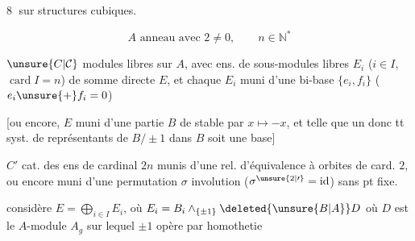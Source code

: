 \textcircled{8}  sur structures cubiques.

\[
 A\text{ anneau avec }2\ne0,\qquad n\in\mathbb{N}^{*}
\]

$\unsure{C|\mathcal{C}}$  modules libres  sur $A$, avec  ens. de  sous-modules libres $E_i$ ($i\in I$, $\operatorname{card} I=n$) de somme directe $E$, et chaque $E_i$ muni d'une bi-base $\{e_i,f_i\}$ ($e_i\unsure{+}f_i=0$)

[ou encore, $E$ muni d'une partie $B$ de  stable par $x\longmapsto-x$, et telle que un \textendash{} donc tt \textendash{} syst. de représentants de $B/\pm1$ dans $B$ soit une base]

\diagram{\begin{tikzcd}[ampersand replacement=\&,row sep=small]
 {}\arrow[d,"\wr"']\\ {}
\end{tikzcd}}
$C'$ cat. des ens  de cardinal $2n$ munis d'une rel. d'équivalence  à orbites de card. $2$, ou encore muni d'une permutation $\sigma$ involution ($\sigma^{\unsure{2|\prime}}=\mathrm{id}$) sans pt fixe.

considère $E=\bigoplus_{i\in I}E_i$, où $E_i=B_i\wedge_{\{\pm1\}}\deleted{\unsure{B|A}}D$ où $D$ est le $A$-module $A_g$ sur lequel $\pm1$ opère par homothetie

